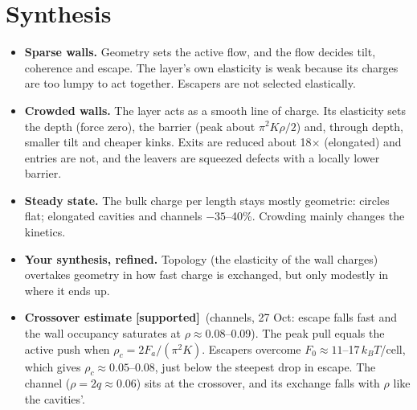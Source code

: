 \documentclass[11pt,a4paper]{article}
\newcommand{\kT}{k_BT}
\newcommand{\supp}{\textbf{\textcolor{green!50!black}{[supported]}}}
\begin{document}
\section{Synthesis}
\begin{itemize}
\item \textbf{Sparse walls.} Geometry sets the active flow, and the flow decides tilt, coherence and escape. The layer's own elasticity is weak because its charges are too lumpy to act together. Escapers are not selected elastically.
\item \textbf{Crowded walls.} The layer acts as a smooth line of charge. Its elasticity sets the depth (force zero), the barrier (peak about $\pi^2K\rho/2$) and, through depth, smaller tilt and cheaper kinks. Exits are reduced about 18$\times$ (elongated) and entries are not, and the leavers are squeezed defects with a locally lower barrier.
\item \textbf{Steady state.} The bulk charge per length stays mostly geometric: circles flat; elongated cavities and channels $-35$--40\%. Crowding mainly changes the kinetics.
\item \textbf{Your synthesis, refined.} Topology (the elasticity of the wall charges) overtakes geometry in how fast charge is exchanged, but only modestly in where it ends up.
\item \textbf{Crossover estimate} \supp\ (channels, 27 Oct: escape falls fast and the wall occupancy saturates at $\rho\approx0.08$--0.09). The peak pull equals the active push when $\rho_c=2F_a/(\pi^2K)$. Escapers overcome $F_0\approx11$--17\,$\kT$/cell, which gives $\rho_c\approx0.05$--0.08, just below the steepest drop in escape. The channel ($\rho=2q\approx0.06$) sits at the crossover, and its exchange falls with $\rho$ like the cavities'.
\end{itemize}
\end{document}
